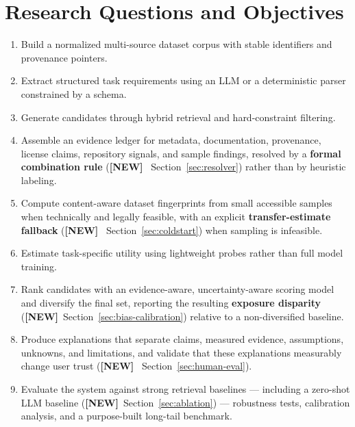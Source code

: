 \documentclass[11pt]{article}
\newcommand{\newtag}{\textcolor{accent}{\textbf{[NEW]}}\ }
\begin{document}
\section{Research Questions and Objectives}
\begin{enumerate}[leftmargin=*]
\item Build a normalized multi-source dataset corpus with stable identifiers and provenance pointers.
\item Extract structured task requirements using an LLM or a deterministic parser constrained by a schema.
\item Generate candidates through hybrid retrieval and hard-constraint filtering.
\item Assemble an evidence ledger for metadata, documentation, provenance, license claims, repository
      signals, and sample findings, resolved by a \textbf{formal combination rule} (\newtag
      Section~\ref{sec:resolver}) rather than by heuristic labeling.
\item Compute content-aware dataset fingerprints from small accessible samples when technically and
      legally feasible, with an explicit \textbf{transfer-estimate fallback} (\newtag
      Section~\ref{sec:coldstart}) when sampling is infeasible.
\item Estimate task-specific utility using lightweight probes rather than full model training.
\item Rank candidates with an evidence-aware, uncertainty-aware scoring model and diversify the final set,
      reporting the resulting \textbf{exposure disparity} (\newtag Section~\ref{sec:bias-calibration})
      relative to a non-diversified baseline.
\item Produce explanations that separate claims, measured evidence, assumptions, unknowns, and
      limitations, and validate that these explanations measurably change user trust (\newtag
      Section~\ref{sec:human-eval}).
\item Evaluate the system against strong retrieval baselines --- including a zero-shot LLM baseline
      (\newtag Section~\ref{sec:ablation}) --- robustness tests, calibration analysis, and a
      purpose-built long-tail benchmark.
\end{enumerate}

\end{document}
